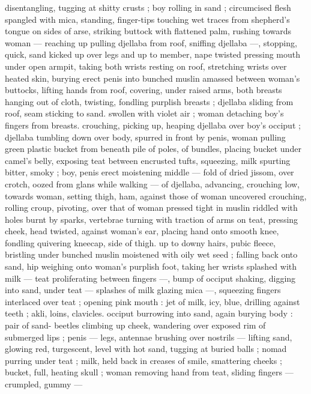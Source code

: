 {disentangling, tugging at shitty crusts ; boy rolling in sand ; 
circumcised flesh spangled with mica, standing, finger-tips touching 
wet traces from shepherd's tongue on sides of arse, striking buttock 
with flattened palm, rushing towards woman --- reaching up pulling 
djellaba from roof, sniffing djellaba ---, stopping, quick, sand kicked 
up over legs and up to member, nape twisted pressing mouth under 
open armpit, taking both wrists resting on roof, stretching wrists over 
heated skin, burying erect penis into bunched muslin amassed 
between woman's buttocks, lifting hands from roof, covering, under 
raised arms, both breasts hanging out of cloth, twisting, fondling 
purplish breasts ; djellaba sliding from roof, seam sticking to sand. 
swollen with violet air ; woman detaching boy's fingers from breasts. 
crouching, picking up, heaping djellaba over boy's occiput ; djellaba 
tumbling down over body, spurred in front by penis, woman pulling 
green plastic bucket from beneath pile of poles, of bundles, placing 
bucket under camel's belly, exposing teat between encrusted tufts, 
squeezing, milk spurting bitter, smoky ; boy, penis erect moistening 
middle --- fold of dried jissom, over crotch, oozed from glans while 
walking --- of djellaba, advancing, crouching low, towards woman, 
setting thigh, ham, against those of woman uncovered crouching, 
rolling croup, pivoting, over that of woman pressed tight in muslin 
riddled with holes burnt by sparks, vertebrae turning with traction of 
arms on teat, pressing cheek, head twisted, against woman's ear, 
placing hand onto smooth knee, fondling quivering kneecap, side of 
thigh. up to downy hairs, pubic fleece, bristling under bunched 
muslin moistened with oily wet seed ; falling back onto sand, hip 
weighing onto woman's purplish foot, taking her wrists splashed with 
milk --- teat proliferating between fingers ---, bump of occiput 
shaking, digging into sand, under teat --- splashes of milk glazing 
mica ---, squeezing fingers interlaced over teat ; opening pink mouth 
: jet of milk, icy, blue, drilling against teeth ; akli, loins, clavicles. 
occiput burrowing into sand, again burying body : pair of sand- 
beetles climbing up cheek, wandering over exposed rim of 
submerged lips ; penis --- legs, antennae brushing over nostrils --- 
lifting sand, glowing red, turgescent, level with hot sand, tugging at 
buried balls ; nomad purring under teat ; milk, held back in creases 
of smile, smattering cheeks ; bucket, full, heating skull ; woman 
removing hand from teat, sliding fingers --- crumpled, gummy --- 
}
